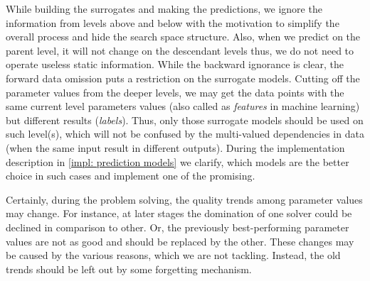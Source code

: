 While building the surrogates and making the predictions, we ignore the information from levels above and below with the motivation to simplify the overall process and hide the search space structure. Also, when we predict on the parent level, it will not change on the descendant levels thus, we do not need to operate useless static information. While the backward ignorance is clear, the forward data omission puts a restriction on the surrogate models. Cutting off the parameter values from the deeper levels, we may get the data points with the same current level parameters values (also called as \emph{features} in machine learning) but different results (\emph{labels}). Thus, only those surrogate models should be used on such level(s), which will not be confused by the multi-valued dependencies in data (when the same input result in different outputs). During the implementation description in \cref{impl: prediction models} we clarify, which models are the better choice in such cases and implement one of the promising.

Certainly, during the problem solving, the quality trends among parameter values may change. For instance, at later stages the domination of one solver could be declined in comparison to other. Or, the previously best-performing parameter values are not as good and should be replaced by the other. These changes may be caused by the various reasons, which we are not tackling. Instead, the old trends should be left out by some forgetting mechanism.

